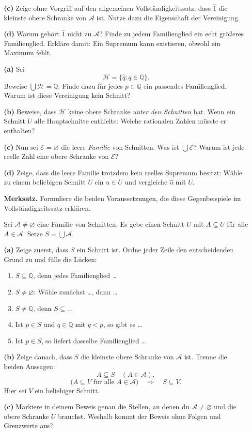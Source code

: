 \textbf{(c)} Zeige ohne Vorgriff auf den allgemeinen
Vollständigkeitssatz, dass $\widehat1$ die kleinste obere Schranke
von $\mathcal A$ ist. Nutze dazu die Eigenschaft der Vereinigung.

\textbf{(d)} Warum gehört $\widehat1$ nicht zu $\mathcal A$?
Finde zu jedem Familienglied ein echt größeres Familienglied.
Erkläre damit: Ein Supremum kann existieren, obwohl ein Maximum fehlt.

\textbf{(a)} Sei
\[
 \mathcal H=\{\widehat q:q\in\mathbb Q\}.
\]
Beweise $\bigcup\mathcal H=\mathbb Q$.
Finde dazu für jedes $p\in\mathbb Q$ ein passendes Familienglied.
Warum ist diese Vereinigung kein Schnitt?

\textbf{(b)} Beweise, dass $\mathcal H$ keine obere Schranke
\emph{unter den Schnitten} hat. Wenn ein Schnitt $U$ alle
Hauptschnitte enthielte: Welche rationalen Zahlen müsste er enthalten?

\textbf{(c)} Nun sei $\mathcal E=\varnothing$ die leere
\emph{Familie} von Schnitten. Was ist $\bigcup\mathcal E$?
Warum ist jede reelle Zahl eine obere Schranke von $\mathcal E$?

\textbf{(d)} Zeige, dass die leere Familie trotzdem kein
reelles Supremum besitzt: Wähle zu einem beliebigen Schnitt $U$
ein $u\in U$ und vergleiche $\widehat u$ mit $U$.

\textbf{Merksatz.} Formuliere die beiden Voraussetzungen,
die diese Gegenbeispiele im Vollständigkeitssatz erklären.

Sei $\mathcal A\ne\varnothing$ eine Familie von Schnitten.
Es gebe einen Schnitt $U$ mit $A\subseteq U$ für alle
$A\in\mathcal A$. Setze $S=\bigcup\mathcal A$.

\textbf{(a)} Zeige zuerst, dass $S$ ein Schnitt ist.
Ordne jeder Zeile den entscheidenden Grund zu und fülle die Lücken:
\begin{enumerate}[label=\arabic*.]
 \item $S\subseteq\mathbb Q$, denn jedes Familienglied \ldots
 \item $S\ne\varnothing$: Wähle zunächst \ldots, dann \ldots
 \item $S\ne\mathbb Q$, denn $S\subseteq\ldots$
 \item Ist $p\in S$ und $q\in\mathbb Q$ mit $q<p$, so gibt es \ldots
 \item Ist $p\in S$, so liefert dasselbe Familienglied \ldots
\end{enumerate}

\textbf{(b)} Zeige danach, dass $S$ die kleinste obere Schranke
von $\mathcal A$ ist. Trenne die beiden Aussagen:
\[
 A\subseteq S\quad(A\in\mathcal A),
\]
\[
 \bigl(A\subseteq V\text{ für alle }A\in\mathcal A\bigr)
 \quad\Longrightarrow\quad S\subseteq V.
\]
Hier sei $V$ ein beliebiger Schnitt.

\textbf{(c)} Markiere in deinem Beweis genau die Stellen,
an denen du $\mathcal A\ne\varnothing$ und die obere Schranke $U$
brauchst. Weshalb kommt der Beweis ohne Folgen und Grenzwerte aus?
